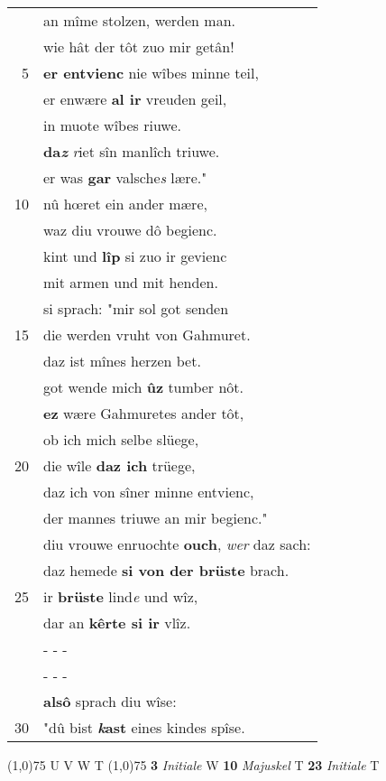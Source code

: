 \documentclass[8pt,a4paper,notitlepage]{article}
\begin{document}
\begin{table}[ht]
\begin{minipage}[t]{0.5\linewidth}
\begin{tabular}{rl}
 & an mîme stolzen, werden man.\\ 
 & wie hât der tôt zuo mir getân!\\ 
5 & \textbf{er entvienc} nie wîbes minne teil,\\ 
 & er enwære \textbf{al ir} vreuden geil,\\ 
 & in muote wîbes riuwe.\\ 
 & \textbf{da\textit{z}} \textit{r}iet sîn manlîch triuwe.\\ 
 & er was \textbf{gar} valsche\textit{s} lære."\\ 
10 & nû hœret ein ander mære,\\ 
 & waz diu vrouwe dô begienc.\\ 
 & kint und \textbf{lîp} si zuo ir gevienc\\ 
 & mit armen und mit henden.\\ 
 & si sprach: "mir sol got senden\\ 
15 & die werden vruht von Gahmuret.\\ 
 & daz ist mînes herzen bet.\\ 
 & got wende mich \textbf{ûz} tumber nôt.\\ 
 & \textbf{ez} wære Gahmuretes ander tôt,\\ 
 & ob ich mich selbe slüege,\\ 
20 & die wîle \textbf{daz ich} trüege,\\ 
 & daz ich von sîner minne entvienc,\\ 
 & der mannes triuwe an mir begienc."\\ 
 & diu vrouwe enruochte \textbf{ouch}, \textit{wer} daz sach:\\ 
 & daz hemede \textbf{si von der brüste} brach.\\ 
25 & ir \textbf{brüste} lind\textit{e} und wîz,\\ 
 & dar an \textbf{kêrte si ir} vlîz.\\ 
 & \multicolumn{1}{l}{ - - - }\\ 
 & \multicolumn{1}{l}{ - - - }\\ 
 & \textbf{alsô} sprach diu wîse:\\ 
30 & "dû bist \textbf{\textit{k}ast} eines kindes spîse.\\ 
\end{tabular}
\scriptsize
\line(1,0){75} \newline
U V W T \newline
\line(1,0){75} \newline
\textbf{3} \textit{Initiale} W  \textbf{10} \textit{Majuskel} T  \textbf{23} \textit{Initiale} T  \newline

\end{minipage}
\end{table}
\end{document}
